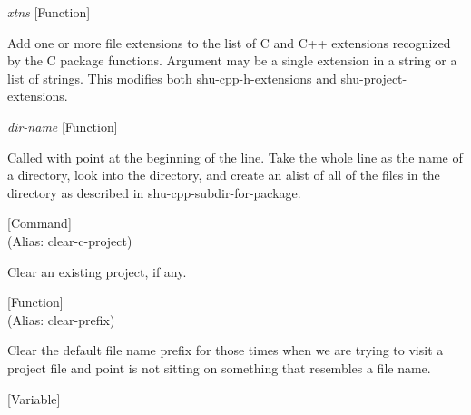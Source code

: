 \vspace{1em}
\noindent
{}
\usebox{\funcname}\emph{xtns}
 \hfill [Function]

\begin{doc-string}
Add one or more file extensions to the list of C and C++ extensions recognized by the
C package functions.  Argument may be a single extension in a string or a list of strings.
This modifies both shu-cpp-h-extensions and shu-project-extensions.
\end{doc-string}

\vspace{1em}
\noindent
{}
\usebox{\funcname}\emph{dir-name}
 \hfill [Function]

\begin{doc-string}
Called with point at the beginning of the line.  Take the whole line as the
name of a directory, look into the directory, and create an alist of all of the
files in the directory as described in shu-cpp-subdir-for-package.
\end{doc-string}

\vspace{1em}
\noindent
{}
\usebox{\funcname}
 \hfill [Command]\\%
 (Alias: clear-c-project)

\begin{doc-string}
Clear an existing project, if any.
\end{doc-string}

\vspace{1em}
\noindent
{}
\usebox{\funcname}
 \hfill [Function]\\%
 (Alias: clear-prefix)

\begin{doc-string}
Clear the default file name prefix for those times when we are trying to visit
a project file and point is not sitting on something that resembles a file name.
\end{doc-string}

\vspace{1em}
\noindent
{}
\usebox{\funcname}
 \hfill [Variable]

